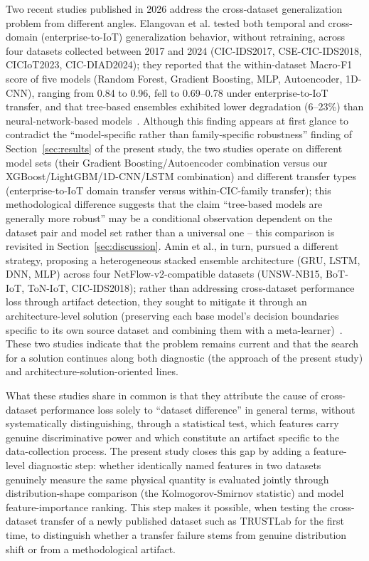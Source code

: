 \documentclass[a4paper,fleqn]{cas-sc}
\begin{document}
Two recent studies published in 2026 address the cross-dataset generalization problem from different angles. Elangovan et al. tested both temporal and cross-domain (enterprise-to-IoT) generalization behavior, without retraining, across four datasets collected between 2017 and 2024 (CIC-IDS2017, CSE-CIC-IDS2018, CICIoT2023, CIC-DIAD2024); they reported that the within-dataset Macro-F1 score of five models (Random Forest, Gradient Boosting, MLP, Autoencoder, 1D-CNN), ranging from 0.84 to 0.96, fell to 0.69--0.78 under enterprise-to-IoT transfer, and that tree-based ensembles exhibited lower degradation (6--23\%) than neural-network-based models~\cite{Elangovan2026}. Although this finding appears at first glance to contradict the ``model-specific rather than family-specific robustness'' finding of Section~\ref{sec:results} of the present study, the two studies operate on different model sets (their Gradient Boosting/Autoencoder combination versus our XGBoost/LightGBM/1D-CNN/LSTM combination) and different transfer types (enterprise-to-IoT domain transfer versus within-CIC-family transfer); this methodological difference suggests that the claim ``tree-based models are generally more robust'' may be a conditional observation dependent on the dataset pair and model set rather than a universal one -- this comparison is revisited in Section~\ref{sec:discussion}. Amin et al., in turn, pursued a different strategy, proposing a heterogeneous stacked ensemble architecture (GRU, LSTM, DNN, MLP) across four NetFlow-v2-compatible datasets (UNSW-NB15, BoT-IoT, ToN-IoT, CIC-IDS2018); rather than addressing cross-dataset performance loss through artifact detection, they sought to mitigate it through an architecture-level solution (preserving each base model's decision boundaries specific to its own source dataset and combining them with a meta-learner)~\cite{Amin2026}. These two studies indicate that the problem remains current and that the search for a solution continues along both diagnostic (the approach of the present study) and architecture-solution-oriented lines.

What these studies share in common is that they attribute the cause of cross-dataset performance loss solely to ``dataset difference'' in general terms, without systematically distinguishing, through a statistical test, which features carry genuine discriminative power and which constitute an artifact specific to the data-collection process. The present study closes this gap by adding a feature-level diagnostic step: whether identically named features in two datasets genuinely measure the same physical quantity is evaluated jointly through distribution-shape comparison (the Kolmogorov-Smirnov statistic) and model feature-importance ranking. This step makes it possible, when testing the cross-dataset transfer of a newly published dataset such as TRUSTLab for the first time, to distinguish whether a transfer failure stems from genuine distribution shift or from a methodological artifact.
\end{document}
